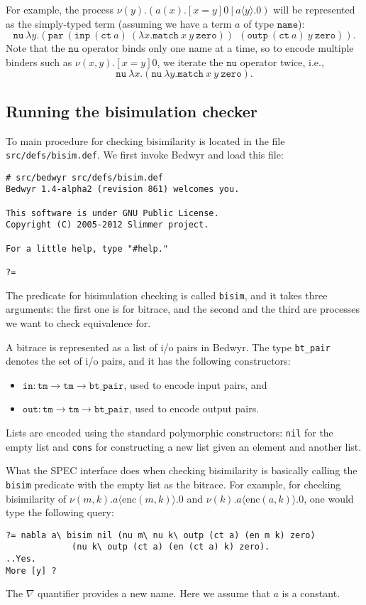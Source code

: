 \documentclass{article}
\newcommand\obj[1]{\texttt{#1}}
\begin{document}
For example, the process $\nu (y).(a(x).[x = y] 0 ~|~ a\langle y\rangle.0)$ will be represented
as the simply-typed term (assuming we have a term $a$ of type $\obj{name}$):
$$
\obj{nu} ~ \lambda y. (\obj{par}~ (\obj{inp}~(\obj{ct}~a)~(\lambda x. \obj{match}~x~y~\obj{zero}))
~~ (\obj{outp}~ (\obj{ct}~a) ~ y ~ \obj{zero})).
$$
Note that the $\obj{nu}$ operator binds only one name at a time, so to encode
multiple binders such as $\nu (x,y).[x=y]0$, we iterate the $\obj{nu}$ operator twice, i.e.,
$$
\obj{nu}~\lambda x.(\obj{nu}~\lambda y.\obj{match}~x~y~\obj{zero}).
$$
\subsection{Running the bisimulation checker}

To main procedure for checking bisimilarity is located in the file \obj{src/defs/bisim.def}.
We first invoke Bedwyr and load this file:
\begin{verbatim}
# src/bedwyr src/defs/bisim.def
Bedwyr 1.4-alpha2 (revision 861) welcomes you.

This software is under GNU Public License.
Copyright (C) 2005-2012 Slimmer project.

For a little help, type "#help."

?= 
\end{verbatim}
The predicate for bisimulation checking is called \texttt{bisim}, and it takes three
arguments: the first one is for bitrace, and the second and the third are processes
we want to check equivalence for. 

A bitrace is represented as a list of i/o pairs in Bedwyr. The type \texttt{bt\_pair}
denotes the set of i/o pairs, and it has the following constructors:
\begin{itemize}
\item $\obj{in} : \obj{tm} \to \obj{tm} \to \obj{bt\_pair}$, used to encode input pairs, and
\item $\obj{out} : \obj{tm} \to \obj{tm} \to \obj{bt\_pair}$, used to encode output pairs.
\end{itemize}
Lists are encoded using the standard polymorphic constructors: \obj{nil} for
the empty list and \obj{cons} for constructing a new list given an element and another list.

What the SPEC interface does when checking bisimilarity is basically calling the \obj{bisim}
predicate with the empty list as the bitrace.
For example, for checking bisimilarity of 
$\nu (m,k). a\langle \mathrm{enc}(m,k) \rangle.0$ and 
$\nu (k). a\langle \mathrm{enc}(a,k) \rangle.0$, one would type the following
query:
\begin{verbatim}
?= nabla a\ bisim nil (nu m\ nu k\ outp (ct a) (en m k) zero) 
             (nu k\ outp (ct a) (en (ct a) k) zero).
..Yes.
More [y] ? 
\end{verbatim}
The $\nabla$ quantifier provides a new name. Here we assume that $a$ is a constant. 
\end{document}
